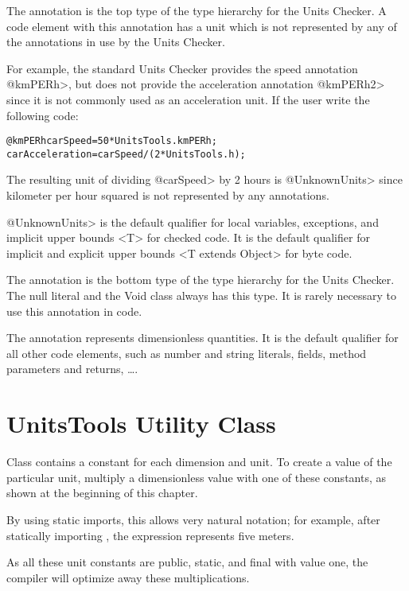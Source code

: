 The annotation  is the top type
of the type hierarchy for the Units Checker. A code element with this annotation
has a unit which is not represented by any of the annotations in use by the
Units Checker.

For example, the standard Units Checker provides the speed annotation
\<@kmPERh>, but does not provide the acceleration annotation \<@kmPERh2> since
it is not commonly used as an acceleration unit. If the user write the following
code:

\begin{alltt}
@kmPERh carSpeed = 50 * UnitsTools.kmPERh;
carAcceleration = carSpeed / (2 * UnitsTools.h);
\end{alltt}

The resulting unit of dividing \<@carSpeed> by 2 hours is \<@UnknownUnits> since
kilometer per hour squared is not represented by any annotations.

\<@UnknownUnits> is the default qualifier for local variables, exceptions, and
implicit upper bounds <T> for checked code. It is the default qualifier for
implicit and explicit upper bounds <T extends Object> for byte code.

The annotation  is the bottom
type of the type hierarchy for the Units Checker. The null literal and the Void
class always has this type. It is rarely necessary to use this annotation in
code.

The annotation  represents
dimensionless quantities. It is the default qualifier for all other code
elements, such as number and string literals, fields, method parameters and
returns, \dots.

\section{UnitsTools Utility Class\label{units-tools}}

Class  contains a constant for each dimension and unit. To
create a value of the particular unit, multiply a dimensionless value with one
of these constants, as shown at the beginning of this chapter.

By using static imports, this allows very natural notation; for example, after
statically importing , the expression  represents
five meters.

As all these unit constants are public, static, and final with value one, the
compiler will optimize away these multiplications.

